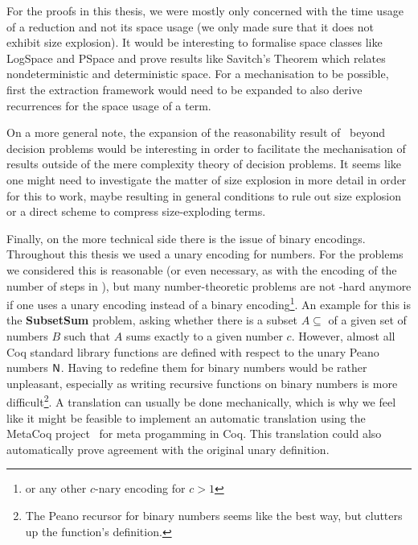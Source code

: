 For the proofs in this thesis, we were mostly only concerned with the time usage of a reduction and not its space usage (we only made sure that it does not exhibit size explosion). It would be interesting to formalise space classes like \textsf{LogSpace} and \textsf{PSpace} and prove results like Savitch's Theorem which relates nondeterministic and deterministic space. For a mechanisation to be possible, first the extraction framework would need to be expanded to also derive recurrences for the space usage of a term.

On a more general note, the expansion of the reasonability result of~\cite{ForsterKunzeRoth:2019:wcbv-Reasonable} beyond decision problems would be interesting in order to facilitate the mechanisation of results outside of the mere complexity theory of decision problems. It seems like one might need to investigate the matter of size explosion in more detail in order for this to work, maybe resulting in general conditions to rule out size explosion or a direct scheme to compress size-exploding terms. 

Finally, on the more technical side there is the issue of binary encodings. Throughout this thesis we used a unary encoding for numbers. For the problems we considered this is reasonable (or even necessary, as with the encoding of the number of steps in \gennp{}), but many number-theoretic problems are not \NP{}-hard anymore if one uses a unary encoding instead of a binary encoding\footnote{or any other $c$-nary encoding for $c> 1$}. An example for this is the \textbf{SubsetSum} problem, asking whether there is a subset $A \subseteq$ of a given set of numbers $B$ such that $A$ sums exactly to a given number $c$. 
However, almost all Coq standard library functions are defined with respect to the unary Peano numbers $\mathsf{N}$. 
Having to redefine them for binary numbers would be rather unpleasant, especially as writing recursive functions on binary numbers is more difficult\footnote{The Peano recursor for binary numbers seems like the best way, but clutters up the function's definition.}. 
A translation can usually be done mechanically, which is why we feel like it might be feasible to implement an automatic translation using the MetaCoq project~\cite{metacoq_web} for meta progamming in Coq. This translation could also automatically prove agreement with the original unary definition. 

